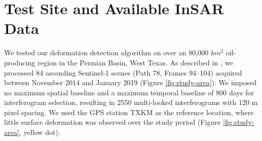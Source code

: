 \documentclass{utexasthesis}
\begin{document}
\section{Test Site and Available InSAR Data}
\label{sec:site}

We tested our deformation detection algorithm on over an 80,000 $km^2$ oil-producing region in the Permian Basin, West Texas.  As described in \cite{Staniewicz2020InsarRevealsComplex}, we processed 84 ascending Sentinel-1 scenes (Path 78, Frames 94–104) acquired between November 2014 and January 2019 (Figure \ref{fig:study-area}). We imposed no maximum spatial baseline and a maximum temporal baseline of 800 days for interferogram selection, resulting in 2550 multi-looked interferograms with 120 m pixel spacing.  We used the GPS station TXKM as the reference location, where little surface deformation was observed over the study period (Figure \ref{fig:study-area}, yellow dot).

\end{document}
